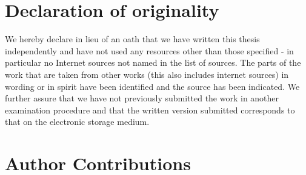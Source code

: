 \documentclass[a4paper,11pt,titlepage]{article}
\begin{document}
\section{Declaration of originality}
We hereby declare in lieu of an oath that we have written this thesis independently and have not used any resources other than those specified - in particular no Internet sources not named in the list of sources. The parts of the work that are taken from other works (this also includes internet sources) in wording or in spirit have been identified and the source has been indicated. We further assure that we have not previously submitted the work in another examination procedure and that the written version submitted corresponds to that on the electronic storage medium.

\section{Author Contributions} 
\end{document}
